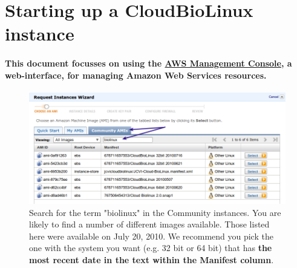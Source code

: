 \section{Starting up a CloudBioLinux instance}
\paragraph{This document focusses on using the \href{http://console.aws.amazon.com/ec2/home}{AWS Management Console}, a web-interface, for managing Amazon Web Services resources.}

\begin{figure}[!hd]	
	\fbox
	{
		\begin{minipage}{13cm}
\includegraphics[width=\maxwidth]{"images/requestInstance"}
\caption[Start an Instance]{\label{fig:requestInstance}Search for the term "biolinux" in the Community instances. You are likely to find a number of different images available. Those listed here were available on July 20, 2010. We recommend you pick the one with the system you want (e.g. 32 bit or 64 bit) that has \textbf{the most recent date in the text within the Manifest column}.}
		\end{minipage}
	}
\end{figure}


